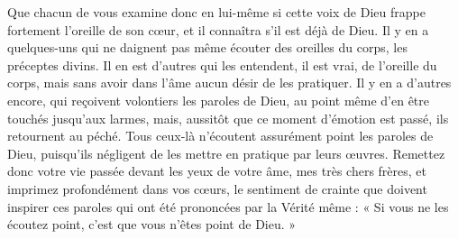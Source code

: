  Que chacun de vous examine donc en lui-même si cette voix de Dieu frappe fortement l’oreille de son cœur, et il connaîtra s’il est déjà de Dieu. Il y en a quelques-uns qui ne daignent pas même écouter des oreilles du corps, les préceptes divins. Il en est d’autres qui les entendent, il est vrai, de l’oreille du corps, mais sans avoir dans l’âme aucun désir de les pratiquer. Il y en a d’autres encore, qui reçoivent volontiers les paroles de Dieu, au point même d’en être touchés jusqu’aux larmes, mais, aussitôt que ce moment d’émotion est passé, ils retournent au péché. Tous ceux-là n’écoutent assurément point les paroles de Dieu, puisqu’ils négligent de les mettre en pratique par leurs œuvres. Remettez donc votre vie passée devant les yeux de votre âme, mes très chers frères, et imprimez profondément dans vos cœurs, le sentiment de crainte que doivent inspirer ces paroles qui ont été prononcées par la Vérité même : « Si vous ne les écoutez point, c’est que vous n’êtes point de Dieu. »
